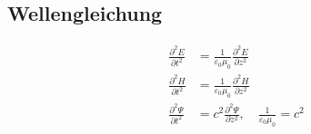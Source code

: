 \subsection{Wellengleichung}
\begin{align*}
    \frac{\partial^2 E}{\partial t^2} &= \frac{1}{\varepsilon_0 \mu_0} \frac{\partial^2 E}{\partial z^2}\\
    \frac{\partial^2 H}{\partial t^2} &= \frac{1}{\varepsilon_0 \mu_0} \frac{\partial^2 H}{\partial z^2}\\
    \frac{\partial^2 \Psi}{\partial t^2} &= c^2 \frac{\partial^2 \Psi}{\partial z^2}, \quad \frac{1}{\varepsilon_0 \mu_0} = c^2
\end{align*}